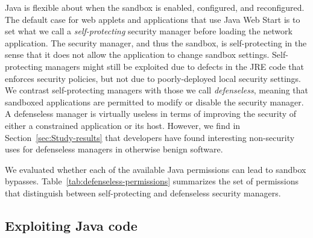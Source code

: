 \documentclass{sig-alternate-05-2015}
\begin{document}
Java is flexible about when the sandbox
is enabled, configured, and reconfigured. The default case for web applets and applications
that use Java Web Start is to set what we call a \textit{self-protecting} security
manager before loading the network application. The security
manager, and thus the sandbox, is self-protecting in the sense that
it does not allow the application to change sandbox settings. Self-protecting managers might
still be exploited due to defects in the JRE code that enforces security
policies, but not due to poorly-deployed local security settings. We contrast
self-protecting managers with those we call 
\textit{defenseless}, meaning that sandboxed applications are 
permitted to modify or disable the security manager.  
A defenseless manager is virtually useless in terms of improving the
security of either a constrained application or its host. However, we find
in Section~\ref{sec:Study-results} that developers
have found interesting non-security uses for defenseless managers in otherwise
benign software.

We evaluated whether each of the available Java permissions
can lead to sandbox bypasses. Table~\ref{tab:defenseless-permissions} summarizes the set of permissions
that distinguish between self-protecting and defenseless security
managers.

\subsection{Exploiting Java code}
\label{sec:javaexploits}
\end{document}
